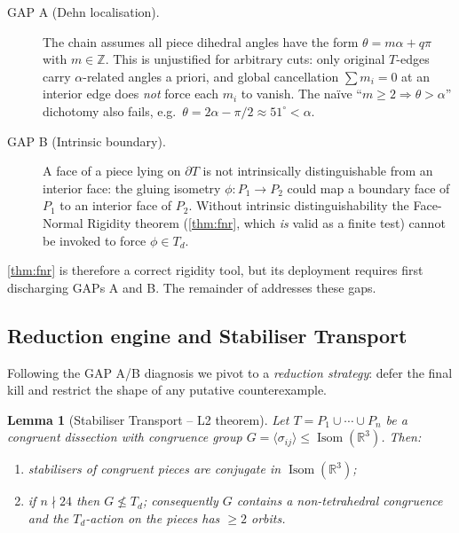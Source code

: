 \documentclass[11pt,a4paper]{article}
\theoremstyle{plain}
\newtheorem{lemma}[lemma]{Lemma}
\theoremstyle{definition}
\theoremstyle{remark}
\DeclareMathOperator{\Isom}{Isom}
\newcommand{\Td}{T_{\!d}}
\newcommand{\R}{\mathbb{R}}
\newcommand{\Z}{\mathbb{Z}}
\begin{document}
\begin{description}
\item[GAP A (Dehn localisation).]
  The chain assumes all piece dihedral angles have the form
  $\theta = m\alpha + q\pi$ with $m \in \Z$.  This is unjustified for
  arbitrary cuts: only original $T$-edges carry $\alpha$-related angles a
  priori, and global cancellation $\sum m_{i} = 0$ at an interior edge
  does \emph{not} force each $m_{i}$ to vanish.  The na\"ive
  ``$m \geq 2 \Rightarrow \theta > \alpha$'' dichotomy also fails, e.g.\
  $\theta = 2\alpha - \pi/2 \approx 51^{\circ} < \alpha$.
\item[GAP B (Intrinsic boundary).]
  A face of a piece lying on $\partial T$ is not intrinsically
  distinguishable from an interior face: the gluing isometry
  $\phi \colon P_{1} \to P_{2}$ could map a boundary face of $P_{1}$ to an
  interior face of $P_{2}$.  Without intrinsic distinguishability the
  Face-Normal Rigidity theorem (\cref{thm:fnr}, which \emph{is} valid as a
  finite test) cannot be invoked to force $\phi \in \Td$.
\end{description}

\cref{thm:fnr} is therefore a correct rigidity tool, but its deployment
requires first discharging GAPs A and B.  The remainder of 
addresses these gaps.

\subsection{Reduction engine and Stabiliser Transport}\label{ssec:reduction-engine}

Following the GAP A/B diagnosis we pivot to a \emph{reduction strategy}:
defer the final kill and restrict the shape of any putative counterexample.

\begin{lemma}[Stabiliser Transport -- \textsf{L2} theorem]\label{lem:stab-transport}
Let $T = P_{1} \cup \cdots \cup P_{n}$ be a congruent dissection with
congruence group $G = \langle \sigma_{ij} \rangle \leq \Isom(\R^{3})$.
Then:
\begin{enumerate}
  \item[(a)] stabilisers of congruent pieces are conjugate in $\Isom(\R^{3})$;
  \item[(b)] if $n \nmid 24$ then $G \not\leq \Td$; consequently $G$ contains
             a non-tetrahedral congruence and the $\Td$-action on the pieces
             has $\geq 2$ orbits.
\end{enumerate}
\end{lemma}
\end{document}
